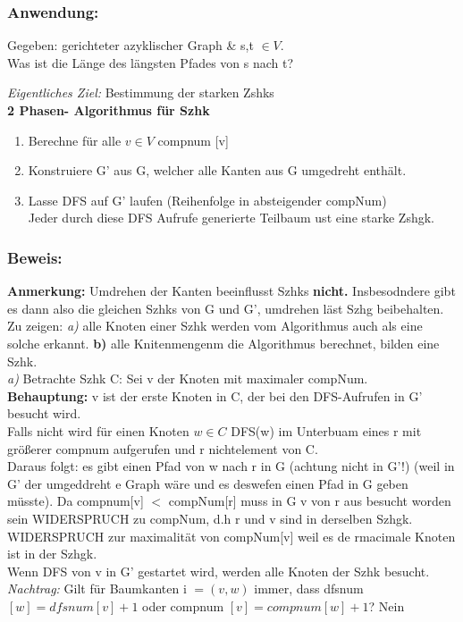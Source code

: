 \documentclass{article}
\begin{document}
\subsubsection{Anwendung: } Gegeben: gerichteter azyklischer Graph & s,t $ \in V$. \\
Was ist die Länge des längsten Pfades von s nach t? 

\textit{Eigentliches Ziel:} Bestimmung der starken Zshks\\
\newline
\textbf{2 Phasen- Algorithmus für Szhk}
\begin{enumerate}
    \item Berechne für  alle $v \in V$ compnum [v]
    \item Konstruiere G' aus G, welcher alle Kanten aus G umgedreht enthält.
    \item  Lasse DFS auf G' laufen (Reihenfolge in absteigender compNum)  \\
    Jeder durch diese DFS Aufrufe generierte Teilbaum ust eine starke Zshgk.
\end{enumerate}
\subsubsection{Beweis:} \textbf{Anmerkung: } Umdrehen der Kanten beeinflusst Szhks \textbf{nicht.} Insbesodndere gibt es dann also die gleichen Szhks von G und G', umdrehen läst Szhg beibehalten. \\
Zu zeigen: \newline
\textit{a)} alle Knoten einer Szhk werden vom Algorithmus auch als eine solche erkannt. \newline
\textbf{b)} alle Knitenmengenm die Algorithmus berechnet, bilden eine Szhk.  \\
\newline
\textit{a)} Betrachte Szhk C: Sei v der Knoten mit maximaler compNum. \\
\textbf{Behauptung: } v ist der erste Knoten in C, der bei den DFS-Aufrufen in G' besucht wird.\\
Falls nicht wird für einen Knoten $w \in C$ DFS(w) im Unterbuam eines r mit größerer compnum aufgerufen und r nichtelement von C.\\
Daraus folgt: es gibt einen Pfad von w nach r in G (achtung nicht in G'!) (weil in G' der umgeddreht e Graph wäre und es deswefen einen Pfad in G geben müsste). Da compnum[v] $<$ compNum[r] muss in G
v von r aus besucht worden sein WIDERSPRUCH zu compNum, d.h r und v sind in derselben Szhgk. WIDERSPRUCH zur maximalität von compNum[v] weil es de rmacimale Knoten ist in der Szhgk.\\
Wenn DFS von v in G' gestartet wird, werden alle Knoten der Szhk besucht. 
\newline
\newline
\textit{Nachtrag:} Gilt für Baumkanten i $= (v,w)$ immer, dass dfsnum$[w] = dfsnum [v] +1 $ oder compnum $[v] = compnum [w] +1$? Nein \\
\end{document}
